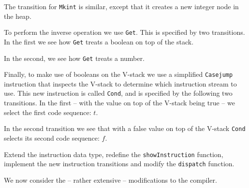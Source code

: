 \gmruleodv%
{}%
{}
%
The transition for \mbox{\tt Mkint} is similar, except that it creates a new
integer node in the heap.

\gmruleodv%
{}%
{}

To perform the inverse operation we use \mbox{\tt Get}. This is specified by
two transitions. In the first we see how \mbox{\tt Get} treats a boolean on top
of the stack.

\gmruleodv%
{}%
{}
%
In the second, we see how \mbox{\tt Get} treats a number.

\gmruleodv%
{}%
{}

Finally, to make use of booleans on the V-stack we use a simplified
\mbox{\tt Casejump} instruction that inspects the V-stack to determine which
instruction stream to use. This new instruction is called \mbox{\tt Cond}, and
is specified by the following two transitions. In the first -- with
the value on top of the V-stack being true -- we select the first code
sequence: $t$.

\gmruleodv%
{}%
{}
%
In the second transition we see that with a false value on top of the
V-stack \mbox{\tt Cond} selects its second code sequence: $f$.

\gmruleodv%
{}%
{}

\begin{exercise}\label{gm:X:instruction}
Extend the instruction data type, redefine the \mbox{\tt showInstruction}
function, implement the new instruction transitions and modify the
\mbox{\tt dispatch} function.
\end{exercise}

We now consider the -- rather extensive -- modifications to the
compiler.

